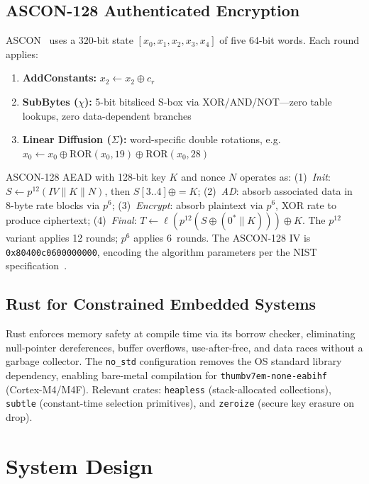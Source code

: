 \documentclass[anonymous]{ndss}
\newcommand{\nstd}{\texttt{no\_std}}
\begin{document}
\subsection{ASCON-128 Authenticated Encryption}

ASCON~\cite{b9} uses a 320-bit state $[x_0, x_1, x_2, x_3, x_4]$
of five 64-bit words. Each round applies:
\begin{enumerate}
  \item \textbf{AddConstants:} $x_2 \leftarrow x_2 \oplus c_r$
  \item \textbf{SubBytes ($\chi$):} 5-bit bitsliced S-box via
        XOR/AND/NOT---zero table lookups, zero data-dependent branches
  \item \textbf{Linear Diffusion ($\Sigma$):} word-specific double rotations,
        e.g.\ $x_0 \leftarrow x_0 \oplus \mathrm{ROR}(x_0,19) \oplus
        \mathrm{ROR}(x_0,28)$
\end{enumerate}

ASCON-128 AEAD with 128-bit key $K$ and nonce $N$ operates as:
(1)~\textit{Init}: $S \leftarrow p^{12}(\mathit{IV}\|K\|N)$, then
$S[3..4] \oplus{=} K$;
(2)~\textit{AD}: absorb associated data in 8-byte rate blocks via $p^6$;
(3)~\textit{Encrypt}: absorb plaintext via $p^6$, XOR rate to produce
ciphertext;
(4)~\textit{Final}: $T \leftarrow \ell(p^{12}(S\oplus(0^*\|K)))\oplus K$.
The $p^{12}$ variant applies 12 rounds; $p^6$ applies 6~rounds.
The ASCON-128 IV is \texttt{0x80400c0600000000}, encoding the algorithm
parameters per the NIST specification~\cite{b5}.

\subsection{Rust for Constrained Embedded Systems}

Rust enforces memory safety at compile time via its borrow checker,
eliminating null-pointer dereferences, buffer overflows, use-after-free,
and data races without a garbage collector. The \nstd{} configuration
removes the OS standard library dependency, enabling bare-metal
compilation for \texttt{thumbv7em-none-eabihf} (Cortex-M4/M4F).
Relevant crates: \texttt{heapless} (stack-allocated collections),
\texttt{subtle} (constant-time selection primitives), and
\texttt{zeroize} (secure key erasure on drop).

\section{System Design}
\label{sec:design}
\end{document}
